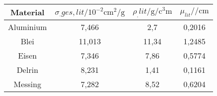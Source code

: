 
	\begin{tabular}{cS[table-format=2.3]S[table-format=2.2]S[table-format=1.4]}
		\toprule
		{Material} & {$\sigma_.{ges,lit}/10^{-2}\si{\centi\metre\squared\per\gram}$} & {$\rho_.{lit}/\si{\gram\per\cubic\centi\metre}$} & {$\mu_{lit}/\si{\per\centi\metre}$} \\
		\midrule
		{Aluminium}	& 7,466 	& 2,7 	& 0,2016 \\
		{Blei}     	& 11,013 	& 11,34	& 1,2485 \\
		{Eisen}	 	& 7,346 	& 7,86 	& 0,5774 \\
		{Delrin}	 	& 8,231 	& 1,41 	& 0,1161 \\
		{Messing}	& 7,282 	& 8,52 	& 0,6204 \\
		\bottomrule
	\end{tabular}
